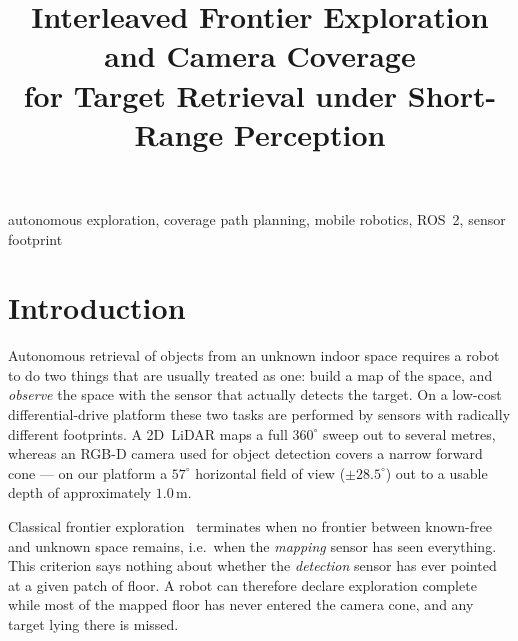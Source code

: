 \documentclass[conference,a4paper,10pt]{IEEEtran}
\begin{document}
\title{Interleaved Frontier Exploration and Camera Coverage\\
for Target Retrieval under Short-Range Perception}

\author{
}

\maketitle

\begin{IEEEkeywords}
autonomous exploration, coverage path planning, mobile robotics, ROS~2,
sensor footprint
\end{IEEEkeywords}

\section{Introduction}
Autonomous retrieval of objects from an unknown indoor space requires a robot to
do two things that are usually treated as one: build a map of the space, and
\emph{observe} the space with the sensor that actually detects the target. On a
low-cost differential-drive platform these two tasks are performed by sensors
with radically different footprints. A 2D~LiDAR maps a full \(360^{\circ}\)
sweep out to several metres, whereas an RGB-D camera used for object detection
covers a narrow forward cone --- on our platform a \(57^{\circ}\) horizontal
field of view (\(\pm 28.5^{\circ}\)) out to a usable depth of approximately
\(1.0\,\mathrm{m}\).

Classical frontier exploration~\cite{yamauchi} terminates when no frontier
between known-free and unknown space remains, i.e.\ when the \emph{mapping}
sensor has seen everything. This criterion says nothing about whether the
\emph{detection} sensor has ever pointed at a given patch of floor. A robot can
therefore declare exploration complete while most of the mapped floor has never
entered the camera cone, and any target lying there is missed.
\end{document}
